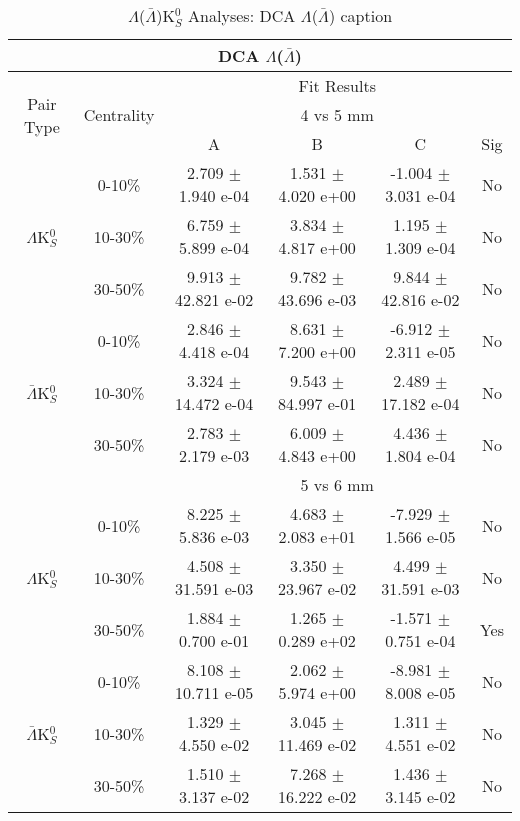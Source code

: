 \documentclass[../AnalysisNoteJBuxton.tex]{subfiles}
\begin{document}
\begin{table}
 \centering
 \begin{tabular}{|c|c|c|c|c|c|}
  \multicolumn{6}{c}{DCA $\Lambda$($\bar{\Lambda}$)} \\
  \hline
  \multirow{3}{*}{Pair Type} & \multirow{3}{*}{Centrality} & \multicolumn{4}{c|}{Fit Results} \\
  \cline{3-6}
   & & \multicolumn{4}{c|}{4 vs 5 mm} \\
  \cline{3-6}
   & & A & B & C & Sig \\
  \hline  
  \multirow{3}{*}{$\Lambda$K$^{0}_{S}$}
   &  0-10\% & 2.709 $\pm$ 1.940 e-04 & 1.531 $\pm$ 4.020 e+00 & -1.004 $\pm$ 3.031 e-04 & No \\
   & 10-30\% & 6.759 $\pm$ 5.899 e-04 & 3.834 $\pm$ 4.817 e+00 & 1.195 $\pm$ 1.309 e-04 & No \\
   & 30-50\% & 9.913 $\pm$ 42.821 e-02 & 9.782 $\pm$ 43.696 e-03 & 9.844 $\pm$ 42.816 e-02 & No \\
  \hline
  \multirow{3}{*}{$\bar{\Lambda}$K$^{0}_{S}$}  
   &  0-10\% & 2.846 $\pm$ 4.418 e-04 & 8.631 $\pm$ 7.200 e+00 & -6.912 $\pm$ 2.311 e-05 & No \\
   & 10-30\% & 3.324 $\pm$ 14.472 e-04 & 9.543 $\pm$ 84.997 e-01 & 2.489 $\pm$ 17.182 e-04 & No \\
   & 30-50\% & 2.783 $\pm$ 2.179 e-03 & 6.009 $\pm$ 4.843 e+00 & 4.436 $\pm$ 1.804 e-04 & No \\
  \hline 
  \multicolumn{2}{|c|}{} & \multicolumn{4}{c|}{5 vs 6 mm} \\
  \hline  
  \multirow{3}{*}{$\Lambda$K$^{0}_{S}$}   
   &  0-10\% & 8.225 $\pm$ 5.836 e-03 & 4.683 $\pm$ 2.083 e+01 & -7.929 $\pm$ 1.566 e-05 & No \\
   & 10-30\% & 4.508 $\pm$ 31.591 e-03 & 3.350 $\pm$ 23.967 e-02 & 4.499 $\pm$ 31.591 e-03 & No \\
   & 30-50\% & 1.884 $\pm$ 0.700 e-01 & 1.265 $\pm$ 0.289 e+02 & -1.571 $\pm$ 0.751 e-04 & Yes \\
  \hline  
  \multirow{3}{*}{$\bar{\Lambda}$K$^{0}_{S}$}
   &  0-10\% & 8.108 $\pm$ 10.711 e-05 & 2.062 $\pm$ 5.974 e+00 & -8.981 $\pm$ 8.008 e-05 & No \\
   & 10-30\% & 1.329 $\pm$ 4.550 e-02 & 3.045 $\pm$ 11.469 e-02 & 1.311 $\pm$ 4.551 e-02 & No \\
   & 30-50\% & 1.510 $\pm$ 3.137 e-02 & 7.268 $\pm$ 16.222 e-02 & 1.436 $\pm$ 3.145 e-02 & No \\
  \hline
 \end{tabular}
 \caption{$\Lambda$($\bar{\Lambda}$)K$^{0}_{S}$ Analyses: DCA $\Lambda$($\bar{\Lambda}$) caption}
 \label{tab:LamDcaLamK0Full}
\end{table}
\end{document}
